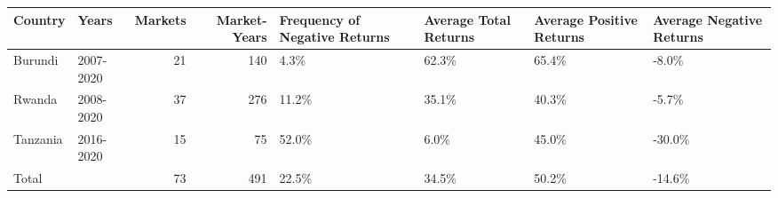 \begin{table}[ht]
\centering
\begin{tabular}{llrrllll}
  \hline
Country & Years & Markets & Market-Years & Frequency of Negative Returns & Average Total Returns & Average Positive Returns & Average Negative Returns \\ 
  \hline
Burundi & 2007-2020 &  21 & 140 & 4.3\% & 62.3\% & 65.4\% & -8.0\% \\ 
  Rwanda & 2008-2020 &  37 & 276 & 11.2\% & 35.1\% & 40.3\% & -5.7\% \\ 
  Tanzania & 2016-2020 &  15 &  75 & 52.0\% & 6.0\% & 45.0\% & -30.0\% \\ 
  Total &   &  73 & 491 & 22.5\% & 34.5\% & 50.2\% & -14.6\% \\ 
   \hline
\end{tabular}
\end{table}
